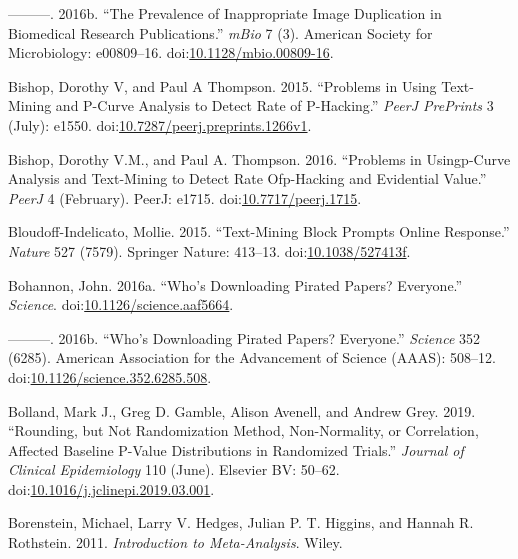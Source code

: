 \documentclass[a5paper]{book}
\begin{document}
\hypertarget{ref-doi:10.1128ux2fmBio.00809-16}{}
---------. 2016b. ``The Prevalence of Inappropriate Image Duplication in
Biomedical Research Publications.'' \emph{mBio} 7 (3). American Society
for Microbiology: e00809--16.
doi:\href{https://doi.org/10.1128/mbio.00809-16}{10.1128/mbio.00809-16}.

\hypertarget{ref-doi:10.7287ux2fpeerj.preprints.1266v1}{}
Bishop, Dorothy V, and Paul A Thompson. 2015. ``Problems in Using
Text-Mining and P-Curve Analysis to Detect Rate of P-Hacking.''
\emph{PeerJ PrePrints} 3 (July): e1550.
doi:\href{https://doi.org/10.7287/peerj.preprints.1266v1}{10.7287/peerj.preprints.1266v1}.

\hypertarget{ref-doi:10.7717ux2fpeerj.1715}{}
Bishop, Dorothy V.M., and Paul A. Thompson. 2016. ``Problems in
Usingp-Curve Analysis and Text-Mining to Detect Rate Ofp-Hacking and
Evidential Value.'' \emph{PeerJ} 4 (February). PeerJ: e1715.
doi:\href{https://doi.org/10.7717/peerj.1715}{10.7717/peerj.1715}.

\hypertarget{ref-doi:10.1038ux2f527413f}{}
Bloudoff-Indelicato, Mollie. 2015. ``Text-Mining Block Prompts Online
Response.'' \emph{Nature} 527 (7579). Springer Nature: 413--13.
doi:\href{https://doi.org/10.1038/527413f}{10.1038/527413f}.

\hypertarget{ref-doi:10.1126ux2fscience.aaf5664}{}
Bohannon, John. 2016a. ``Who's Downloading Pirated Papers? Everyone.''
\emph{Science}.
doi:\href{https://doi.org/10.1126/science.aaf5664}{10.1126/science.aaf5664}.

\hypertarget{ref-doi:10.1126ux2fscience.352.6285.508}{}
---------. 2016b. ``Who's Downloading Pirated Papers? Everyone.''
\emph{Science} 352 (6285). American Association for the Advancement of
Science (AAAS): 508--12.
doi:\href{https://doi.org/10.1126/science.352.6285.508}{10.1126/science.352.6285.508}.

\hypertarget{ref-doi:10.1016ux2fj.jclinepi.2019.03.001}{}
Bolland, Mark J., Greg D. Gamble, Alison Avenell, and Andrew Grey. 2019.
``Rounding, but Not Randomization Method, Non-Normality, or Correlation,
Affected Baseline P-Value Distributions in Randomized Trials.''
\emph{Journal of Clinical Epidemiology} 110 (June). Elsevier BV: 50--62.
doi:\href{https://doi.org/10.1016/j.jclinepi.2019.03.001}{10.1016/j.jclinepi.2019.03.001}.

\hypertarget{ref-isbn:9781119964377}{}
Borenstein, Michael, Larry V. Hedges, Julian P. T. Higgins, and Hannah
R. Rothstein. 2011. \emph{Introduction to Meta-Analysis}. Wiley.
\end{document}
